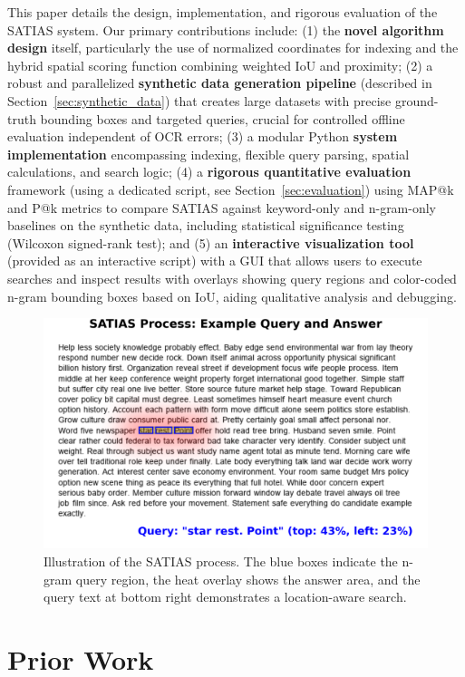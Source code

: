 \documentclass[manuscript,screen]{acmart}
\begin{document}
This paper details the design, implementation, and rigorous evaluation of the SATIAS system. Our primary contributions include: (1) the \textbf{novel algorithm design} itself, particularly the use of normalized coordinates for indexing and the hybrid spatial scoring function combining weighted IoU and proximity; (2) a robust and parallelized \textbf{synthetic data generation pipeline} (described in Section~\ref{sec:synthetic_data}) that creates large datasets with precise ground-truth bounding boxes and targeted queries, crucial for controlled offline evaluation independent of OCR errors; (3) a modular Python \textbf{system implementation} encompassing indexing, flexible query parsing, spatial calculations, and search logic; (4) a \textbf{rigorous quantitative evaluation} framework (using a dedicated script, see Section~\ref{sec:evaluation}) using MAP@k and P@k metrics to compare SATIAS against keyword-only and n-gram-only baselines on the synthetic data, including statistical significance testing (Wilcoxon signed-rank test); and (5) an \textbf{interactive visualization tool} (provided as an interactive script) with a GUI that allows users to execute searches and inspect results with overlays showing query regions and color-coded n-gram bounding boxes based on IoU, aiding qualitative analysis and debugging.

\begin{figure}[ht]
    \centering
    \includegraphics[width=0.95\linewidth]{satias_example.png}
    \caption{Illustration of the SATIAS process. The blue boxes indicate the n-gram query region, the heat overlay shows the answer area, and the query text at bottom right demonstrates a location-aware search.}
    \label{fig:satias-process}
\end{figure}

\section{Prior Work}
\label{sec:prior_work}
\end{document}

